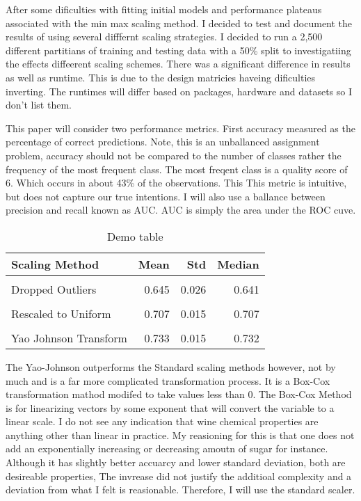 \documentclass[16pt,twocolumn,letterpaper,titlepage]{article}
\begin{document}
After some dificulties with fitting initial models and performance plateaus associated with the min max scaling method. I decided to test and document the results of using several difffernt scaling strategies. I decided to run a 2,500 different partitians of training and testing data with a 50\% split to investigatiing the effects diffeerent scaling schemes. There was a significant difference in results as well as runtime. This is due to the design matricies haveing dificulties inverting. The runtimes will differ based on packages, hardware and datasets so I don't list them.  

This paper will consider two performance metrics. First accuracy measured as the percentage of correct predictions. Note, this is an unballanced assignment problem, accuracy should not be compared to the number of classes rather the frequency of the most frequent class. The most freqent class is a quality score of 6. Which occurs in about 43\% of the observations. This This metric is intuitive, but does not capture our true intentions. I will also use a ballance between precision and recall known as AUC. AUC is simply the area under the ROC cuve.
\begin{table}[!h]

\caption{Demo table}
\centering
\begin{tabular}[t]{lrrr}
\toprule
Scaling Method & Mean & Std & Median\\
\midrule
\cellcolor{gray!6}{No Transformation} & \cellcolor{gray!6}{0.590} & \cellcolor{gray!6}{0.024} & \cellcolor{gray!6}{0.592}\\
Dropped Outliers & 0.645 & 0.026 & 0.641\\
\cellcolor{gray!6}{Min Max Scale} & \cellcolor{gray!6}{0.690} & \cellcolor{gray!6}{0.018} & \cellcolor{gray!6}{0.691}\\
Rescaled to Uniform & 0.707 & 0.015 & 0.707\\
\cellcolor{gray!6}{Standard Scale} & \cellcolor{gray!6}{0.726} & \cellcolor{gray!6}{0.017} & \cellcolor{gray!6}{0.725}\\
\addlinespace
Yao Johnson Transform & 0.733 & 0.015 & 0.732\\
\bottomrule
\end{tabular}
\end{table}

The Yao-Johnson outperforms the Standard scaling methods however, not by much and is a far more complicated transformation process. It is a Box-Cox transformation mathod modifed to take values less than 0. The Box-Cox Method is for linearizing vectors by some exponent that will convert the variable to a linear scale. I do not see any indication that wine chemical properties are anything other than linear in practice. My reasioning for this is that one does not add an exponentially increasing or decreasing amoutn of sugar for instance. Although it has slightly better accuarcy and lower standard deviation, both are desireable properties, The invrease did not justify the additioal complexity and a deviation from what I felt is reasionable. Therefore, I will use the standard scaler.
\end{document}
